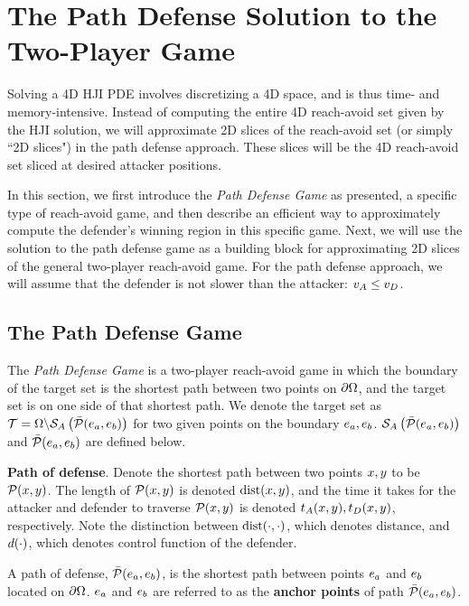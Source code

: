 \section{The Path Defense Solution to the Two-Player Game}
\label{sec:path_defense}
Solving a 4D HJI PDE involves discretizing a 4D space, and is thus time- and memory-intensive. Instead of computing the entire 4D reach-avoid set given by the HJI solution, we will approximate 2D slices of the reach-avoid set (or simply ``2D slices") in the path defense approach. These slices will be the 4D reach-avoid set sliced at desired attacker positions.

In this section, we first introduce the \textit{Path Defense Game} as presented, a specific type of reach-avoid game, and then describe an efficient way to approximately compute the defender's winning region in this specific game. Next, we will use the solution to the path defense game as a building block for approximating 2D slices of the general two-player reach-avoid game. For the path defense approach, we will assume that the defender is not slower than the attacker: $v_A \leq v_D$. 


\subsection{The Path Defense Game}
\label{subsec:pd_game}
The \textit{Path Defense Game} is a two-player reach-avoid game in which the boundary of the target set is the shortest path between two points on $\partial\Omega$, and the target set is on one side of that shortest path. We denote the target set as $\mathcal{T}=\Omega\backslash\mathcal{S}_A\left(\bar{\mathcal{P}}(e_a,e_b)\right)$ for two given points on the boundary $e_a,e_b$. $\mathcal{S}_A\left(\bar{\mathcal{P}}(e_a,e_b)\right)$ and $\bar{\mathcal{P}}(e_a,e_b)$ are defined below. 

\begin{defn} %
\textbf{Path of defense}. Denote the shortest path between two points $x,y$ to be $\mathcal{P}(x,y)$. The length of $\mathcal{P}(x,y)$ is denoted $\text{dist}(x,y)$, and the time it takes for the attacker and defender to traverse $\mathcal{P}(x,y)$ is denoted $t_A(x, y),t_D(x,y)$, respectively. Note the distinction between $\text{dist}(\cdot,\cdot)$, which denotes distance, and $d(\cdot)$, which denotes control function of the defender.

A path of defense, $\bar{\mathcal{P}}(e_a,e_b)$, is the shortest path between points $e_a$ and $e_b$ located on $\partial\Omega$. $e_a$ and $e_b$ are referred to as the \textbf{anchor points} of path $\bar{\mathcal{P}}(e_a,e_b)$. 
\end{defn}

